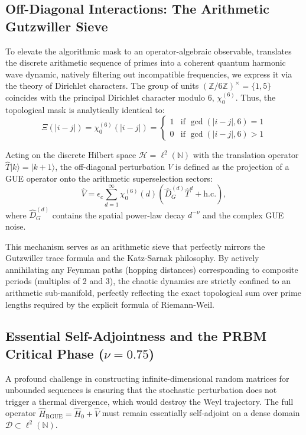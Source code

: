 \documentclass[prl,aps,floatfix,superscriptaddress,10pt]{revtex4-2}
\newcommand{\N}{\mathbb{N}}
\newcommand{\Hilb}{\mathcal{H}}
\newcommand{\Zmod}{\mathbb{Z}/6\mathbb{Z}}
\begin{document}
\subsection{Off-Diagonal Interactions: The Arithmetic Gutzwiller Sieve}

To elevate the algorithmic mask to an operator-algebraic observable, translates the discrete arithmetic sequence of primes into a coherent quantum harmonic wave dynamic, natively filtering out incompatible frequencies, we express it via the theory of Dirichlet characters. The group of units $(\Zmod)^\times = \{1, 5\}$ coincides with the principal Dirichlet character modulo 6, $\chi_0^{(6)}$. Thus, the topological mask is analytically identical to:
\begin{equation}
\Xi(|i-j|) = \chi_0^{(6)}(|i-j|) = \begin{cases} 
1 & \text{if } \gcd(|i-j|, 6) = 1 \\ 
0 & \text{if } \gcd(|i-j|, 6) > 1 
\end{cases}
\end{equation}

Acting on the discrete Hilbert space $\Hilb = \ell^2(\N)$ with the translation operator $\hat{T}|k\rangle = |k+1\rangle$, the off-diagonal perturbation $\hat{V}$ is defined as the projection of a GUE operator onto the arithmetic superselection sectors:
\begin{equation}
\label{eq:interaction}
\hat{V} = \epsilon_c \sum_{d=1}^{\infty} \chi_0^{(6)}(d) \left( \hat{D}_G^{(d)} \hat{T}^d + \text{h.c.} \right),
\end{equation}
where $\hat{D}_G^{(d)}$ contains the spatial power-law decay $d^{-\nu}$ and the complex GUE noise. 

This mechanism serves as an arithmetic sieve that perfectly mirrors the Gutzwiller trace formula and the Katz-Sarnak philosophy. By actively annihilating any Feynman paths (hopping distances) corresponding to composite periods (multiples of 2 and 3), the chaotic dynamics are strictly confined to an arithmetic sub-manifold, perfectly reflecting the exact topological sum over prime lengths required by the explicit formula of Riemann-Weil.

\subsection{Essential Self-Adjointness and the PRBM Critical Phase ($\nu = 0.75$)}

A profound challenge in constructing infinite-dimensional random matrices for unbounded sequences is ensuring that the stochastic perturbation does not trigger a thermal divergence, which would destroy the Weyl trajectory. The full operator $\hat{H}_{\text{RGUE}} = \hat{H}_0 + \hat{V}$ must remain essentially self-adjoint on a dense domain $\mathcal{D} \subset \ell^2(\N)$.
\end{document}
